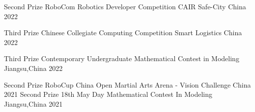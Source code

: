 


\begin{cvhonors}


  
  \cvhonor
    {Second Prize} %
    {RoboCom Robotics Developer Competition CAIR Safe-City} %
    {China} %
    {2022} %
    
  \cvhonor
    {Third Prize} %
    {Chinese Collegiate Computing Competition Smart Logistics} %
    {China} %
    {2022} %
    
  \cvhonor
    {Third Prize} %
    {Contemporary Undergraduate Mathematical Contest in Modeling} %
    {Jiangsu,China} %
    {2022} %
  
  \cvhonor
    {Second Prize} %
    {RoboCup China Open Martial Arts Arena - Vision Challenge} %
    {China} %
    {2021} %
  \cvhonor
    {Second Prize} %
    {18th May Day Mathematical Contest In Modeling} %
    {Jiangsu,China} %
    {2021} %

\end{cvhonors}
